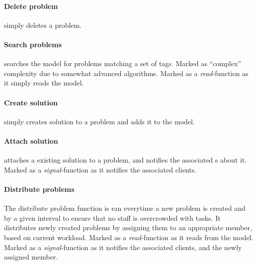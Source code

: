 \paragraph{Delete problem} simply deletes a problem. 

\paragraph{Search problems} searches the model for problems matching a set of tags. Marked as ``complex'' complexity due to somewhat advanced algorithms. Marked as a \textit{read}-function as it simply reads the model.

\paragraph{Create solution} simply creates solution to a problem and adds it to the model. 

\paragraph{Attach solution} attaches a existing solution to a problem, and notifies the associated \client s about it. Marked as a \textit{signal}-function as it notifies the associated clients. 

\paragraph{Distribute problems} The distribute problem function is ran everytime a new problem is created and by a given interval to ensure that no staff is overcrowded with tasks. 
It distributes newly created problems by assigning them to an appropriate \astaff[] member, based on current workload. %
Marked as a \textit{read}-function as it reads from the model. Marked as a \textit{signal}-function as it notifies the associated clients, and the newly assigned \astaff[] member. 


